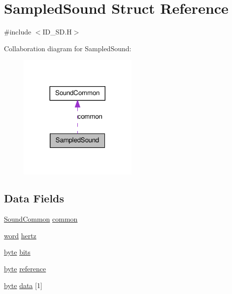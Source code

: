 \hypertarget{structSampledSound}{
\section{SampledSound Struct Reference}
\label{structSampledSound}
}


{\ttfamily \#include $<$ID\_\-SD.H$>$}



Collaboration diagram for SampledSound:
\nopagebreak
\begin{figure}[H]
\begin{center}
\leavevmode
\includegraphics[width=164pt]{structSampledSound__coll__graph}
\end{center}
\end{figure}
\subsection*{Data Fields}
\begin{DoxyCompactItemize}
\item 
\hyperlink{structSoundCommon}{SoundCommon} \hyperlink{structSampledSound_a7a8be674d5909a31a52a8a8a21c1d9a6}{common}
\item 
\hyperlink{ID__HEAD_8H_abad51e07ab6d26bec9f1f786c8d65bcd}{word} \hyperlink{structSampledSound_ae530eb7fb4ee3671108827bab2ff7f11}{hertz}
\item 
\hyperlink{ID__HEAD_8H_a0c8186d9b9b7880309c27230bbb5e69d}{byte} \hyperlink{structSampledSound_af2a0487386cdea8b6af25d39e4009162}{bits}
\item 
\hyperlink{ID__HEAD_8H_a0c8186d9b9b7880309c27230bbb5e69d}{byte} \hyperlink{structSampledSound_ad3803486b4766eff251021eca16b89e2}{reference}
\item 
\hyperlink{ID__HEAD_8H_a0c8186d9b9b7880309c27230bbb5e69d}{byte} \hyperlink{structSampledSound_ab769b22938724a786e2cc1e607f1a455}{data} \mbox{[}1\mbox{]}
\end{DoxyCompactItemize}


